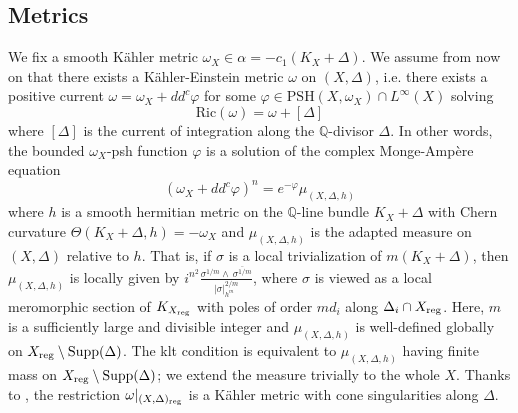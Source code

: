 \documentclass[12pt]{amsart}
\theoremstyle{definition}
\newcommand{\Supp}{\mathrm{Supp}}
\numberwithin{equation}{section}
\newcommand{\Q}{\mathbb Q}
\begin{document}
\subsection{Metrics} 
\label{metrics}
We fix a smooth K\"ahler metric $\omega_X\in \alpha=-c_1(K_X+\Delta)$. 
We assume from now on that there exists a K\"ahler-Einstein metric $\omega$ on $(X,\Delta)$, i.e. there exists a positive current $\omega=\omega_X+dd^c \varphi$ for some $\varphi \in \mathrm{PSH}(X,\omega_X) \cap L^{\infty}(X)$ solving
\begin{equation}
\label{KE}
\mathrm{Ric}(\omega)= \omega+[\Delta]
\end{equation}
where $[\Delta]$ is the current of integration along the $\Q$-divisor $\Delta$. In other words, the bounded $\omega_X$-psh function $\varphi$ is a solution of the complex Monge-Ampère equation
\begin{equation}
\label{MA}
(\omega_X+dd^c \varphi)^n=e^{-\varphi} \mu_{(X,\Delta,h)} 
\end{equation}
where $h$ is a smooth hermitian metric on the $\Q$-line bundle $K_X+\Delta$ with Chern curvature $\Theta(K_X+\Delta,h)=-\omega_X$ and $\mu_{(X,\Delta, h)}$ is the adapted measure on $(X,\Delta)$ relative to $h$. That is, if $\sigma$ is a local trivialization of $m(K_X+\Delta)$, then $\mu_{(X,\Delta,h)}$ is locally given by $i^{n^2}\frac{\sigma^{1/m} \wedge\, \overline{\sigma^{1/m}} }{|\sigma|^{2/m}_{h^{ m}}}$, where $\sigma$ is viewed as a local meromorphic section of $K_{X_{\rm reg}}$ with poles of order $md_i$ along $\Delta_i\cap X_{\rm reg}$. Here, $m$ is a sufficiently large and divisible integer and $\mu_{(X,\Delta,h)}$ is well-defined globally on $X_{\rm reg}\setminus \Supp(\Delta)$. The klt condition is equivalent to 
$\mu_{(X,\Delta,h)}$ having finite mass on $X_{\rm reg}\setminus \Supp(\Delta)$; we extend the measure trivially to the whole $X$. Thanks to \cite[Theorem~2]{GP-conic}, the restriction $\omega|_{(X,\Delta)_{\rm reg}}$ is a K\"ahler metric with cone singularities along $\Delta$. \\
\end{document}
